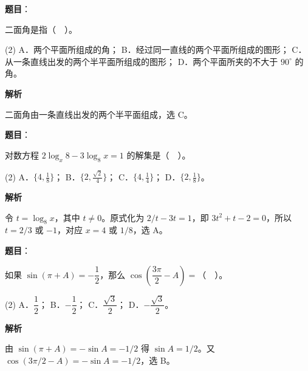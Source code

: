 \begin{answer}

\textbf{题目}：

二面角是指（　）。

\begin{gkopts}(2)
\task A．两个平面所组成的角；
\task B．经过同一直线的两个平面所组成的图形；
\task C．从一条直线出发的两个半平面所组成的图形；
\task D．两个平面所夹的不大于 $90^\circ$ 的角。
\end{gkopts}

\textbf{解析}

二面角由一条直线出发的两个半平面组成，选 C。


\end{answer}
\begin{answer}

\textbf{题目}：

对数方程 $2\log_x 8-3\log_8 x=1$ 的解集是（　）。

\begin{gkopts}(2)
\task A．$\{4,\tfrac18\}$；
\task B．$\{2,\tfrac{\sqrt2}{4}\}$；
\task C．$\{4,\tfrac14\}$；
\task D．$\{2,\tfrac18\}$。
\end{gkopts}

\textbf{解析}

令 $t=\log_8x$，其中 $t\ne0$。原式化为 $2/t-3t=1$，即 $3t^2+t-2=0$，所以 $t=2/3$ 或 $-1$，对应 $x=4$ 或 $1/8$，选 A。


\end{answer}
\begin{answer}

\textbf{题目}：

如果 $\sin(\pi+A)=-\dfrac12$，那么 $\cos\left(\dfrac{3\pi}2-A\right)=$（　）。

\begin{gkopts}(2)
\task A．$\dfrac12$；
\task B．$-\dfrac12$；
\task C．$\dfrac{\sqrt3}2$；
\task D．$-\dfrac{\sqrt3}2$。
\end{gkopts}

\textbf{解析}

由 $\sin(\pi+A)=-\sin A=-1/2$ 得 $\sin A=1/2$。又 $\cos(3\pi/2-A)=-\sin A=-1/2$，选 B。


\end{answer}
